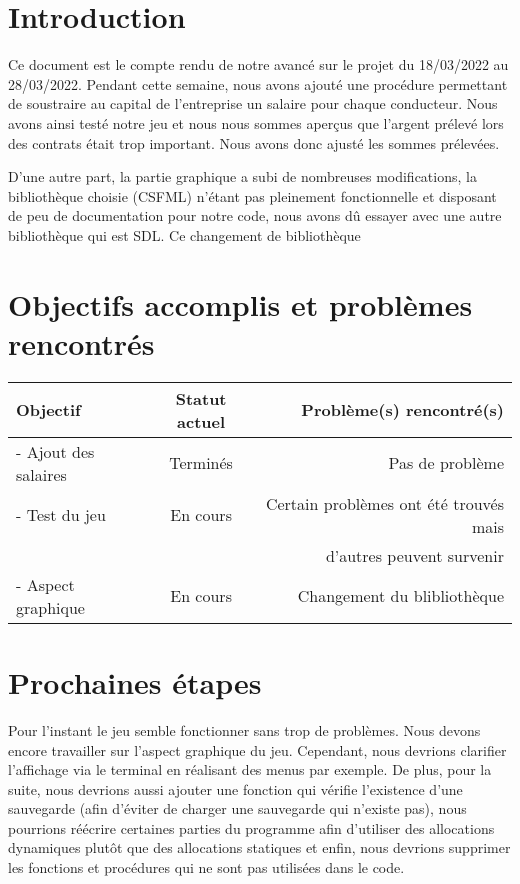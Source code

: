 \documentclass[a4paper, 12pt]{article}
\begin{document}
\newpage



\section*{Introduction}
      Ce document est le compte rendu de notre avancé sur le projet du 18/03/2022 au 28/03/2022. Pendant cette semaine, nous avons ajouté une procédure permettant de soustraire au capital de l'entreprise un salaire pour chaque conducteur. Nous avons ainsi testé notre jeu et nous nous sommes aperçus que l'argent prélevé lors des contrats était trop important. Nous avons donc ajusté les sommes prélevées.

      D'une autre part, la partie graphique a subi de nombreuses modifications, la bibliothèque choisie (CSFML) n'étant pas pleinement fonctionnelle et disposant de peu de documentation pour notre code, nous avons dû essayer avec une autre bibliothèque qui est SDL. Ce changement de bibliothèque 

\section{Objectifs accomplis et problèmes rencontrés}
     \begin{tabular}{|l|c|r|}
  \hline
  Objectif & Statut actuel & Problème(s) rencontré(s) \\
  \hline
   - Ajout des salaires & Terminés & Pas de problème \\
   - Test du jeu & En cours & Certain problèmes ont été trouvés mais \\
    &  & d'autres peuvent survenir \\
     - Aspect graphique & En cours & Changement du blibliothèque \\
  
  

  \hline
\end{tabular}
\section{Prochaines étapes}
    Pour l'instant le jeu semble fonctionner sans trop de problèmes. Nous devons encore travailler sur l'aspect graphique du jeu. Cependant, nous devrions clarifier l'affichage via le terminal en réalisant des menus par exemple. De plus, pour la suite, nous devrions aussi ajouter une fonction qui vérifie l'existence d'une sauvegarde (afin d'éviter de charger une sauvegarde qui n'existe pas), nous pourrions réécrire certaines parties du programme afin d'utiliser des allocations dynamiques plutôt que des allocations statiques et enfin, nous devrions supprimer les fonctions et procédures qui ne sont pas utilisées dans le code. 
    
\end{document}
